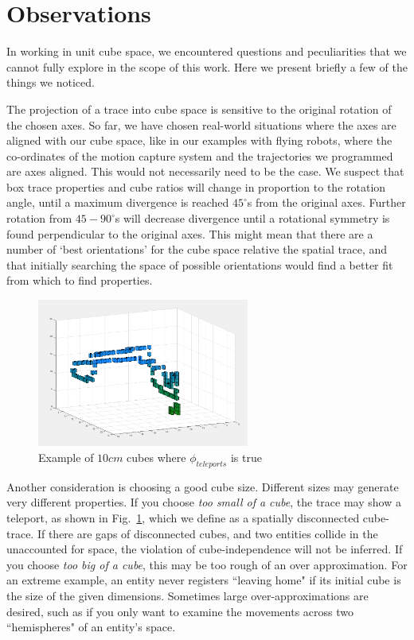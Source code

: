 \section{Observations}
\label{sec:observations}

In working in unit cube space, we encountered questions and peculiarities that we cannot fully explore in the scope of this work.  
Here we present briefly a few of the things we noticed.

The projection of a trace into cube space is sensitive to the original rotation of the chosen axes.
So far, we have chosen real-world situations where the axes are aligned with our cube space, like in our examples with flying robots, where the co-ordinates of the motion capture system and the trajectories we programmed are axes aligned.
This would not necessarily need to be the case.
We suspect that box trace properties and cube ratios will change in proportion to the rotation angle, until a maximum divergence is reached $45^{\circ}$s from the original axes.
Further rotation from $45-90^{\circ}$s will decrease divergence until a rotational symmetry is found perpendicular to the original axes.
This might mean that there are a number of `best orientations' for the cube space relative the spatial trace, and that initially searching the space of possible orientations would find a better fit from which to find properties.

\begin{figure}
  \centering
  \includegraphics[width=0.62\textwidth]{./figures/cubesTooSmall.png}
  \caption{Example of $10cm$ cubes where $\phi_{teleports}$ is true}
  \label{fig:teleport}
\end{figure}

Another consideration is choosing a good cube size.  
Different sizes may generate very different properties.
 If you choose \emph{too small of a cube}, the trace may show a teleport, as shown in Fig.~\ref{fig:teleport}, which we define as a spatially disconnected cube-trace.
If there are gaps of disconnected cubes, and two entities collide in the unaccounted for space, the violation of cube-independence will not be inferred.
 If you choose \emph{too big of a cube}, this may be too rough of an over approximation.
For an extreme example, an entity never registers ``leaving home" if its initial cube is the size of the given dimensions.
Sometimes large over-approximations are desired, such as if you only want to examine the movements across two ``hemispheres" of an entity's space.

